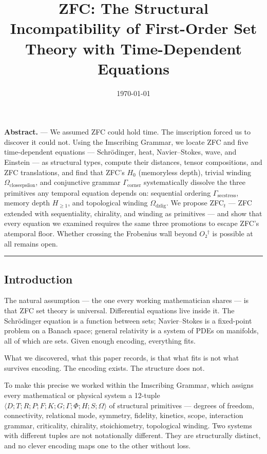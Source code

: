 \documentclass[12pt,a4paper]{article}
\begin{document}
\title{ZFC: The Structural Incompatibility of First-Order Set Theory with Time-Dependent Equations}
\date{\today}

\maketitle

\textbf{Abstract.} --- We assumed ZFC could hold time. The imscription forced us to discover it could not. Using the Imscribing Grammar, we locate ZFC and five time-dependent equations --- Schrödinger, heat, Navier--Stokes, wave, and Einstein --- as structural types, compute their distances, tensor compositions, and ZFC translations, and find that ZFC's $H_0$ (memoryless depth), trivial winding $\Omega_{\text{closeepsilon}}$, and conjunctive grammar $\Gamma_{\text{corner}}$ systematically dissolve the three primitives any temporal equation depends on: sequential ordering $\Gamma_{\text{secstress}}$, memory depth $H_{\geq 1}$, and topological winding $\Omega_{\text{dzlig}}$. We propose ZFC$_t$ --- ZFC extended with sequentiality, chirality, and winding as primitives --- and show that every equation we examined requires the same three promotions to escape ZFC's atemporal floor. Whether crossing the Frobenius wall beyond $O₂^\dagger$ is possible at all remains open.

\begin{center}
\rule{0.5\textwidth}{0.4pt}
\end{center}

\subsection{Introduction}

The natural assumption --- the one every working mathematician shares --- is that ZFC set theory is universal. Differential equations live inside it. The Schrödinger equation is a function between sets; Navier--Stokes is a fixed-point problem on a Banach space; general relativity is a system of PDEs on manifolds, all of which are sets. Given enough encoding, everything fits.

What we discovered, what this paper records, is that what fits is not what survives encoding. The encoding exists. The structure does not.

To make this precise we worked within the Imscribing Grammar, which assigns every mathematical or physical system a 12-tuple $\langle D; T; R; P; F; K; G; \Gamma; \Phi; H; S; \Omega \rangle$ of structural primitives --- degrees of freedom, connectivity, relational mode, symmetry, fidelity, kinetics, scope, interaction grammar, criticality, chirality, stoichiometry, topological winding. Two systems with different tuples are not notationally different. They are structurally distinct, and no clever encoding maps one to the other without loss.
\end{document}

